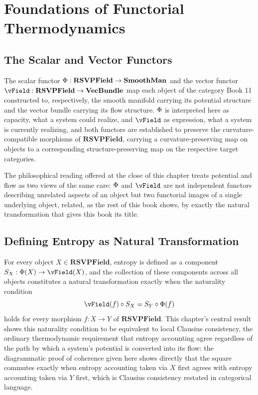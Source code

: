 \part{Foundations of Functorial Thermodynamics}

\chapter{The Scalar and Vector Functors}

The scalar functor $\Phi: \mathbf{RSVPField} \to \mathbf{SmoothMan}$ and the vector functor $\vField: \mathbf{RSVPField} \to \mathbf{VecBundle}$ map each object of the category Book 11 constructed to, respectively, the smooth manifold carrying its potential structure and the vector bundle carrying its flow structure. $\Phi$ is interpreted here as capacity, what a system could realize, and $\vField$ as expression, what a system is currently realizing, and both functors are established to preserve the curvature-compatible morphisms of $\mathbf{RSVPField}$, carrying a curvature-preserving map on objects to a corresponding structure-preserving map on the respective target categories.

The philosophical reading offered at the close of this chapter treats potential and flow as two views of the same care: $\Phi$ and $\vField$ are not independent functors describing unrelated aspects of an object but two functorial images of a single underlying object, related, as the rest of this book shows, by exactly the natural transformation that gives this book its title.

\chapter{Defining Entropy as Natural Transformation}

For every object $X \in \mathbf{RSVPField}$, entropy is defined as a component $\SEntropy_X: \PhiField(X) \to \vField(X)$, and the collection of these components across all objects constitutes a natural transformation exactly when the naturality condition
\[
\vField(f) \circ \SEntropy_X = \SEntropy_Y \circ \PhiField(f)
\]
holds for every morphism $f: X \to Y$ of $\mathbf{RSVPField}$. This chapter's central result shows this naturality condition to be equivalent to local Clausius consistency, the ordinary thermodynamic requirement that entropy accounting agree regardless of the path by which a system's potential is converted into its flow: the diagrammatic proof of coherence given here shows directly that the square commutes exactly when entropy accounting taken via $X$ first agrees with entropy accounting taken via $Y$ first, which is Clausius consistency restated in categorical language.

